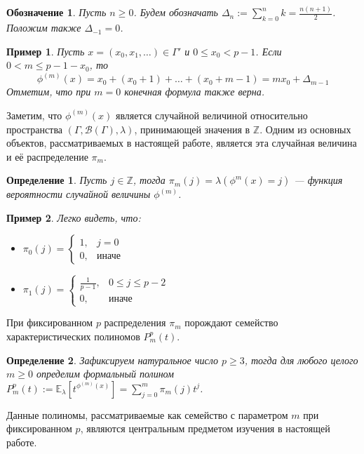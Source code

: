 \documentclass[14pt, a4paper, russian]{report}
\newtheorem{definition}{\indent Определение}
\newtheorem{example}{\indent Пример}
\newtheorem{notation}{\indent Обозначение}
\begin{document}
\begin{notation}
Пусть $n \ge 0$. Будем обозначать $\Delta_n := \sum\limits_{k=0}^{n}k = \frac{n(n+1)}{2}$. Положим также $\Delta_{-1} = 0$.
\end{notation}

\begin{example}\label{phi_delta}
Пусть $x = (x_0, x_1, \ldots) \in \Gamma'$ и $0 \le x_0 < p-1$. Если $0 < m \le p-1-x_0$, то $$\phi^{(m)}(x) = x_0 + (x_0 + 1) + \ldots + (x_0 + m - 1) = mx_0 + \Delta_{m-1}$$
Отметим, что при $m=0$ конечная формула также верна.
\end{example}

Заметим, что $\phi^{(m)}(x)$ является случайной величиной относительно пространства $(\Gamma, \mathcal{B}(\Gamma), \lambda)$, принимающей значения в $\mathbb{Z}$. Одним из основных объектов, рассматриваемых в настоящей работе, является эта случайная величина и её распределение $\pi_m$.
\begin{definition}\label{pi_m}
Пусть $j \in \mathbb{Z}$, тогда $\pi_m(j)=\lambda(\phi^{m}(x)=j)$ --- функция вероятности случайной величины $\phi^{(m)}$.
\end{definition}
\begin{example}\label{pi_example}
Легко видеть, что:
\begin{itemize}
\item $\pi_0(j) = \begin{cases}
1, & j = 0\\
0, & \text{иначе}
\end{cases}$
\item $\pi_1(j)=\begin{cases}
\frac{1}{p-1},& 0 \le j \le p-2 \\
0, & \text{иначе}
\end{cases}$
\end{itemize} 
\end{example}

При фиксированном $p$ распределения $\pi_m$ порождают семейство характеристических полиномов $P_m^p(t)$.

\begin{definition}\label{poly}
Зафиксируем натуральное число $p \ge 3$, тогда для любого целого $m \ge 0$ определим формальный полином $P_m^p(t):= \mathbb{E}_\lambda\left[ t^{\phi^{(m)}(x)}\right] = \sum\limits_{j=0}^m \pi_m(j) t^j$.
\end{definition}

Данные полиномы, рассматриваемые как семейство с параметром $m$ при фиксированном $p$, являются центральным предметом изучения в настоящей работе.
\end{document}
